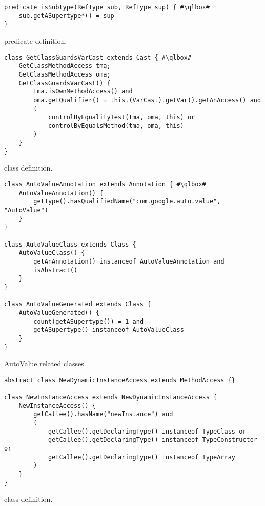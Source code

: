 \begin{listing}
\begin{verbatim}
predicate isSubtype(RefType sub, RefType sup) { #\qlbox#
	sub.getASupertype*() = sup
}
\end{verbatim}
\caption{ predicate definition.}
\label{lst:ql:isSubtype}
\end{listing}


\begin{listing}
\begin{verbatim}	
class GetClassGuardsVarCast extends Cast { #\qlbox#
	GetClassMethodAccess tma;
	GetClassMethodAccess oma;
	GetClassGuardsVarCast() {
		tma.isOwnMethodAccess() and
		oma.getQualifier() = this.(VarCast).getVar().getAnAccess() and
		(
			controlByEqualityTest(tma, oma, this) or
			controlByEqualsMethod(tma, oma, this)
		)
	}
}
\end{verbatim}
\caption{ class definition.}
\label{lst:ql:GetClassGuardsVarCast}
\end{listing}


\begin{listing}
\begin{verbatim}	
class AutoValueAnnotation extends Annotation { #\qlbox#
	AutoValueAnnotation() {
		getType().hasQualifiedName("com.google.auto.value", "AutoValue")
	}
}

class AutoValueClass extends Class {
	AutoValueClass() {
		getAnAnnotation() instanceof AutoValueAnnotation and
		isAbstract()
	}
}

class AutoValueGenerated extends Class {
	AutoValueGenerated() {
		count(getASupertype()) = 1 and
		getASupertype() instanceof AutoValueClass
	}
}
\end{verbatim}
\caption{AutoValue related \ql{} classes.}
\label{lst:ql:AutoValueGenerated}
\end{listing}


\begin{listing}
\begin{verbatim}
abstract class NewDynamicInstanceAccess extends MethodAccess {}

class NewInstanceAccess extends NewDynamicInstanceAccess {
	NewInstanceAccess() {
		getCallee().hasName("newInstance") and
		(
			getCallee().getDeclaringType() instanceof TypeClass or
			getCallee().getDeclaringType() instanceof TypeConstructor or
			getCallee().getDeclaringType() instanceof TypeArray
		)
	}
}
\end{verbatim}
\caption{ class definition.}
\label{lst:ql:NewDynamicInstanceAccess}
\end{listing}



